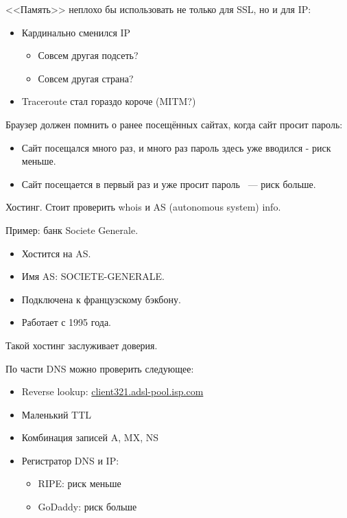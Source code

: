 \documentclass[10pt, a5paper]{article}
\begin{document}
<<Память>> неплохо бы использовать не только для SSL, но и для IP:

\begin{itemize}
  \item Кардинально сменился IP\begin{itemize}
  \item Совсем другая подсеть?
  \item Совсем другая страна?
\end{itemize}


  \item Traceroute стал гораздо короче (MITM?)
\end{itemize}

Браузер должен помнить о ранее посещённых сайтах, когда сайт просит
пароль:

\begin{itemize}
  \item Сайт посещался много раз, и много раз пароль здесь уже вводился -
  риск меньше.
  \item Сайт посещается в первый раз и уже просит пароль ~--- риск больше.
\end{itemize}

Хостинг. Стоит проверить whois и AS (autonomous system) info.

Пример: банк Societe Generale.

\begin{itemize}
  \item Хостится на AS.
  \item Имя AS: SOCIETE-GENERALE.
  \item Подключена к французскому бэкбону.
  \item Работает с 1995 года.
\end{itemize}

Такой хостинг заслуживает доверия.

По части DNS можно проверить следующее:

\begin{itemize}
  \item Reverse lookup: \url{client321.adsl-pool.isp.com}
  \item Маленький TTL
  \item Комбинация записей A, MX, NS
  \item Регистратор DNS и IP:\begin{itemize}
  \item RIPE: риск меньше
  \item GoDaddy: риск больше
\end{itemize}


\end{itemize}
\end{document}
